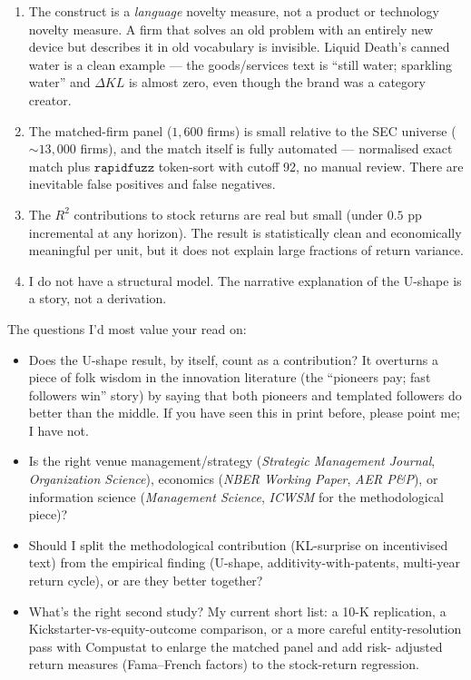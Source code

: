 \documentclass[11pt]{article}
\begin{document}
\begin{enumerate}
  \item The construct is a \emph{language} novelty measure, not a
        product or technology novelty measure. A firm that solves
        an old problem with an entirely new device but describes
        it in old vocabulary is invisible. Liquid Death's canned
        water is a clean example --- the goods/services text is
        ``still water; sparkling water'' and $\Delta KL$ is
        almost zero, even though the brand was a category
        creator.
  \item The matched-firm panel ($1{,}600$ firms) is small relative
        to the SEC universe ($\sim 13{,}000$ firms), and the
        match itself is fully automated --- normalised exact
        match plus $\texttt{rapidfuzz}$ token-sort with cutoff
        92, no manual review. There are inevitable false
        positives and false negatives.
  \item The $R^2$ contributions to stock returns are real but
        small (under $0.5$ pp incremental at any horizon). The
        result is statistically clean and economically meaningful
        per unit, but it does not explain large fractions of
        return variance.
  \item I do not have a structural model. The narrative
        explanation of the U-shape is a story, not a derivation.
\end{enumerate}

The questions I'd most value your read on:

\begin{itemize}
  \item Does the U-shape result, by itself, count as a
        contribution? It overturns a piece of folk wisdom in the
        innovation literature (the ``pioneers pay; fast followers
        win'' story) by saying that both pioneers and templated
        followers do better than the middle. If you have seen
        this in print before, please point me; I have not.
  \item Is the right venue management/strategy
        (\emph{Strategic Management Journal},
        \emph{Organization Science}), economics
        (\emph{NBER Working Paper}, \emph{AER P\&P}), or
        information science (\emph{Management Science},
        \emph{ICWSM} for the methodological piece)?
  \item Should I split the methodological contribution
        (KL-surprise on incentivised text) from the empirical
        finding (U-shape, additivity-with-patents, multi-year
        return cycle), or are they better together?
  \item What's the right second study? My current short list:
        a 10-K replication, a Kickstarter-vs-equity-outcome
        comparison, or a more careful entity-resolution pass
        with Compustat to enlarge the matched panel and add risk-
        adjusted return measures (Fama--French factors) to the
        stock-return regression.
\end{itemize}
\end{document}
